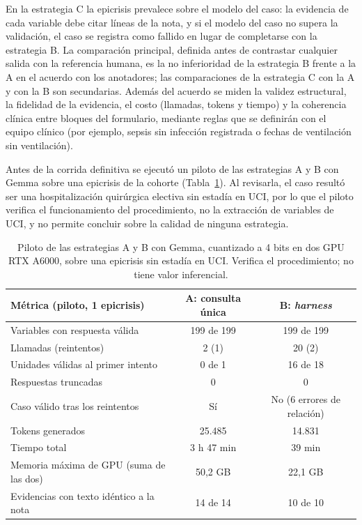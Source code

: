 \documentclass[12pt,letterpaper]{article}
\begin{document}
En la estrategia C la epicrisis prevalece sobre el modelo del caso: la evidencia de cada variable debe citar líneas de la nota, y si el modelo del caso no supera la validación, el caso se registra como fallido en lugar de completarse con la estrategia B. La comparación principal, definida antes de contrastar cualquier salida con la referencia humana, es la no inferioridad de la estrategia B frente a la A en el acuerdo con los anotadores; las comparaciones de la estrategia C con la A y con la B son secundarias. Además del acuerdo se miden la validez estructural, la fidelidad de la evidencia, el costo (llamadas, tokens y tiempo) y la coherencia clínica entre bloques del formulario, mediante reglas que se definirán con el equipo clínico (por ejemplo, sepsis sin infección registrada o fechas de ventilación sin ventilación).

Antes de la corrida definitiva se ejecutó un piloto de las estrategias A y B con Gemma sobre una epicrisis de la cohorte (Tabla~\ref{tab:piloto}). Al revisarla, el caso resultó ser una hospitalización quirúrgica electiva sin estadía en UCI, por lo que el piloto verifica el funcionamiento del procedimiento, no la extracción de variables de UCI, y no permite concluir sobre la calidad de ninguna estrategia.

\begin{table}[htbp]
\centering
\begin{tabular}{lcc}
\toprule
\textbf{Métrica (piloto, 1 epicrisis)} & \textbf{A: consulta única} & \textbf{B: \textit{harness}} \\
\midrule
Variables con respuesta válida & 199 de 199 & 199 de 199 \\
Llamadas (reintentos) & 2 (1) & 20 (2) \\
Unidades válidas al primer intento & 0 de 1 & 16 de 18 \\
Respuestas truncadas & 0 & 0 \\
Caso válido tras los reintentos & Sí & No (6 errores de relación) \\
Tokens generados & 25.485 & 14.831 \\
Tiempo total & 3 h 47 min & 39 min \\
Memoria máxima de GPU (suma de las dos) & 50,2 GB & 22,1 GB \\
Evidencias con texto idéntico a la nota & 14 de 14 & 10 de 10 \\
\bottomrule
\end{tabular}
\caption{Piloto de las estrategias A y B con Gemma, cuantizado a 4 bits en dos GPU RTX A6000, sobre una epicrisis sin estadía en UCI. Verifica el procedimiento; no tiene valor inferencial.}
\label{tab:piloto}
\end{table}
\end{document}
